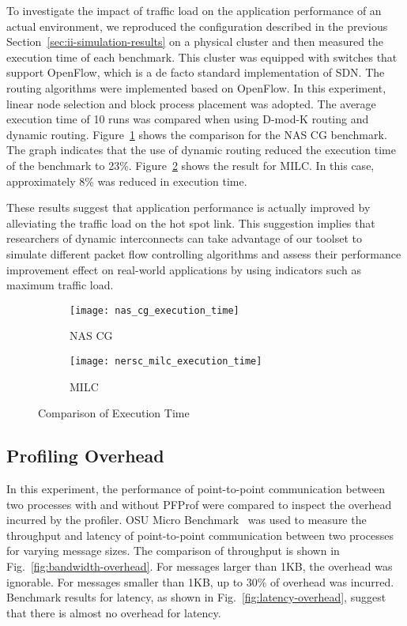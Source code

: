 To investigate the impact of traffic load on the application performance
of an actual environment, we reproduced the configuration described in
the previous Section~\ref{sec:ii-simulation-results} on a physical cluster and
then measured the execution time of each benchmark. This cluster was
equipped with switches that support OpenFlow, which is a de facto
standard implementation of SDN\@. The routing algorithms were implemented
based on OpenFlow. In this experiment, linear node selection and block
process placement was adopted. The average execution time of 10 runs was
compared when using \mbox{D-mod-K} routing and dynamic routing.
Figure~\ref{fig:nas-cg-time} shows the comparison for the NAS CG
benchmark. The graph indicates that the use of dynamic routing reduced
the execution time of the benchmark to 23\%.
Figure~\ref{fig:nersc-milc-time} shows the result for MILC\@. In this
case, approximately 8\% was reduced in execution time.

These results suggest that application performance is actually improved
by alleviating the traffic load on the hot spot link. This suggestion
implies that researchers of dynamic interconnects can take advantage of
our toolset to simulate different packet flow controlling algorithms and
assess their performance improvement effect on real-world applications
by using indicators such as maximum traffic load.

\begin{figure}
    \begin{subfigure}{.47\linewidth}
        \centering
        \texttt{[image: nas\_cg\_execution\_time]}
        \caption{NAS CG}%
        \label{fig:nas-cg-time}
    \end{subfigure}%
    \begin{subfigure}{.47\linewidth}
        \centering
        \texttt{[image: nersc\_milc\_execution\_time]}
        \caption{MILC}%
        \label{fig:nersc-milc-time}
    \end{subfigure}
    \caption{Comparison of Execution Time}%
    \label{fig:single-job-time}
\end{figure}

\subsection{Profiling Overhead}

In this experiment, the performance of point-to-point communication
between two processes with and without PFProf were compared to inspect
the overhead incurred by the profiler. OSU Micro
Benchmark~\autocite{omb} was used to measure the throughput and latency
of point-to-point communication between two processes for varying
message sizes. The comparison of throughput is shown in
Fig.~\ref{fig:bandwidth-overhead}. For messages larger than 1KB, the
overhead was ignorable. For messages smaller than 1KB, up to 30\% of
overhead was incurred. Benchmark results for latency, as shown in
Fig.~\ref{fig:latency-overhead}, suggest that there is almost no
overhead for latency.

